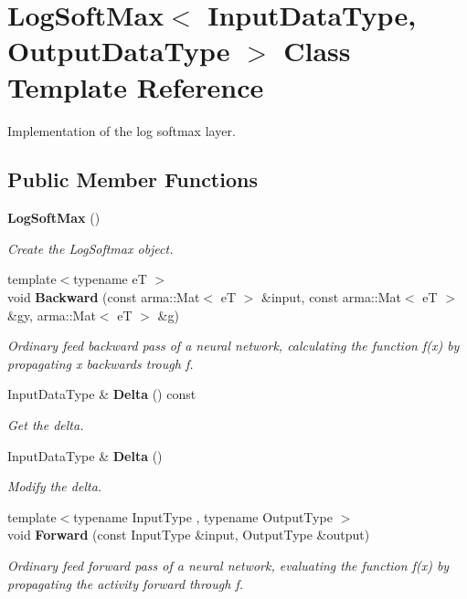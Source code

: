 \section{Log\+Soft\+Max$<$ Input\+Data\+Type, Output\+Data\+Type $>$ Class Template Reference}
\label{classmlpack_1_1ann_1_1LogSoftMax}


Implementation of the log softmax layer.  


\subsection*{Public Member Functions}
\begin{DoxyCompactItemize}
\item 
\textbf{ Log\+Soft\+Max} ()
\begin{DoxyCompactList}\small\item\em Create the Log\+Softmax object. \end{DoxyCompactList}\item 
{\footnotesize template$<$typename eT $>$ }\\void \textbf{ Backward} (const arma\+::\+Mat$<$ eT $>$ \&input, const arma\+::\+Mat$<$ eT $>$ \&gy, arma\+::\+Mat$<$ eT $>$ \&g)
\begin{DoxyCompactList}\small\item\em Ordinary feed backward pass of a neural network, calculating the function f(x) by propagating x backwards trough f. \end{DoxyCompactList}\item 
Input\+Data\+Type \& \textbf{ Delta} () const
\begin{DoxyCompactList}\small\item\em Get the delta. \end{DoxyCompactList}\item 
Input\+Data\+Type \& \textbf{ Delta} ()
\begin{DoxyCompactList}\small\item\em Modify the delta. \end{DoxyCompactList}\item 
{\footnotesize template$<$typename Input\+Type , typename Output\+Type $>$ }\\void \textbf{ Forward} (const Input\+Type \&input, Output\+Type \&output)
\begin{DoxyCompactList}\small\item\em Ordinary feed forward pass of a neural network, evaluating the function f(x) by propagating the activity forward through f. \end{DoxyCompactList}\item 

\end{DoxyCompactItemize}

